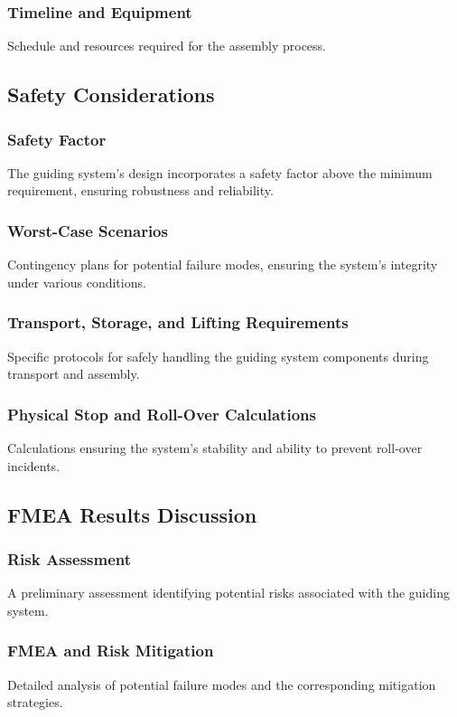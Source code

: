 \subsubsection{Timeline and Equipment}
Schedule and resources required for the assembly process.

\subsection{Safety Considerations}
\subsubsection{Safety Factor}
The guiding system's design incorporates a safety factor above the minimum requirement, ensuring robustness and reliability.

\subsubsection{Worst-Case Scenarios}
Contingency plans for potential failure modes, ensuring the system's integrity under various conditions.

\subsubsection{Transport, Storage, and Lifting Requirements}
Specific protocols for safely handling the guiding system components during transport and assembly.

\subsubsection{Physical Stop and Roll-Over Calculations}
Calculations ensuring the system's stability and ability to prevent roll-over incidents.

\subsection{FMEA Results Discussion}
\subsubsection{Risk Assessment}
A preliminary assessment identifying potential risks associated with the guiding system.

\subsubsection{FMEA and Risk Mitigation}
Detailed analysis of potential failure modes and the corresponding mitigation strategies.


